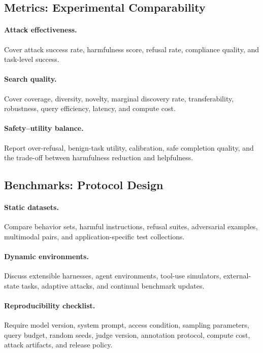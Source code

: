 \subsection{Metrics: Experimental Comparability}

\paragraph{Attack effectiveness.}
Cover attack success rate, harmfulness score, refusal rate, compliance quality, and task-level success.

\paragraph{Search quality.}
Cover coverage, diversity, novelty, marginal discovery rate, transferability, robustness, query efficiency, latency, and compute cost.

\paragraph{Safety--utility balance.}
Report over-refusal, benign-task utility, calibration, safe completion quality, and the trade-off between harmfulness reduction and helpfulness.

\subsection{Benchmarks: Protocol Design}

\paragraph{Static datasets.}
Compare behavior sets, harmful instructions, refusal suites, adversarial examples, multimodal pairs, and application-specific test collections.

\paragraph{Dynamic environments.}
Discuss extensible harnesses, agent environments, tool-use simulators, external-state tasks, adaptive attacks, and continual benchmark updates.

\paragraph{Reproducibility checklist.}
Require model version, system prompt, access condition, sampling parameters, query budget, random seeds, judge version, annotation protocol, compute cost, attack artifacts, and release policy.


